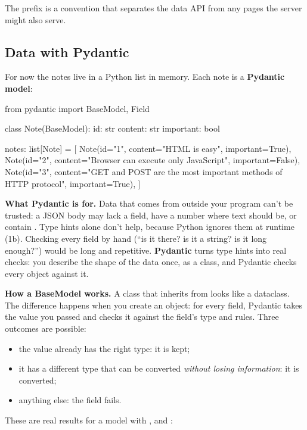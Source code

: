 The  prefix is a convention that separates the data API from any pages the server might also serve.

\subsection{Data with Pydantic}

For now the notes live in a Python list in memory. Each note is a \textbf{Pydantic model}:

\begin{py}
from pydantic import BaseModel, Field


class Note(BaseModel):
	id: str
	content: str
	important: bool


notes: list[Note] = [
	Note(id="1", content="HTML is easy", important=True),
	Note(id="2", content="Browser can execute only JavaScript", important=False),
	Note(id="3", content="GET and POST are the most important methods of HTTP protocol", important=True),
]
\end{py}

\textbf{What Pydantic is for.} Data that comes from outside your program can't be trusted: a JSON body may lack a field, have a number where text should be, or contain . Type hints alone don't help, because Python ignores them at runtime (1b). Checking every field by hand (``is it there? is it a string? is it long enough?'') would be long and repetitive. \textbf{Pydantic} turns type hints into real checks: you describe the shape of the data once, as a class, and Pydantic checks every object against it.

\textbf{How a BaseModel works.} A class that inherits from  looks like a dataclass. The difference happens when you create an object: for every field, Pydantic takes the value you passed and checks it against the field's type and rules. Three outcomes are possible:

\begin{itemize}
\item the value already has the right type: it is kept;
\item it has a different type that can be converted \emph{without losing information}: it is converted;
\item anything else: the field fails.
\end{itemize}

These are real results for a model with ,  and :

